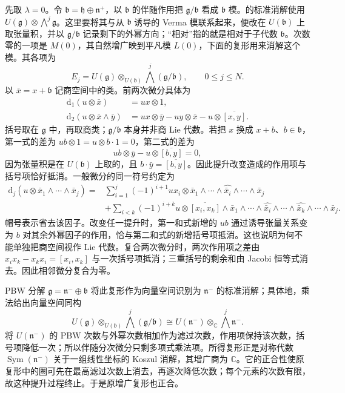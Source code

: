 \begin{proofsketch}
	先取 \(\lambda=0\)。令 \(\mathfrak b=\mathfrak h\oplus\mathfrak n^+\)，以 \(\mathfrak b\) 的伴随作用把 \(\mathfrak g/\mathfrak b\) 看成 \(\mathfrak b\) 模。的标准消解使用 \(U(\mathfrak g)\otimes\bigwedge^j\mathfrak g\)。这里要将其与从 \(\mathfrak b\) 诱导的 Verma 模联系起来，便改在 \(U(\mathfrak b)\) 上取张量积，并以 \(\mathfrak g/\mathfrak b\) 记录剩下的外幂方向；“相对”指的就是相对于子代数 \(\mathfrak b\)。次数零的一项是 \(M(0)\)，其自然增广映到平凡模 \(L(0)\)，下面的复形用来消解这个模。其各项为
	\[
		E_j=U(\mathfrak g)\otimes_{U(\mathfrak b)} \bigwedge^j(\mathfrak g/\mathfrak b), \qquad 0\le j\le N.
	\]
	以 \(\bar x=x+\mathfrak b\) 记商空间中的类。前两次微分具体为
	\[
		\begin{aligned}
			\mathrm{d}_1(u\otimes\bar x)&=ux\otimes1,\\
			\mathrm{d}_2(u\otimes\bar x\wedge\bar y) &=ux\otimes\bar y-uy\otimes\bar x-u\otimes\overline{[x,y]}.
		\end{aligned}
	\]
	括号取在 \(\mathfrak g\) 中，再取商类；\(\mathfrak g/\mathfrak b\) 本身并非商 Lie 代数。若把 \(x\) 换成 \(x+b\)、\(b\in\mathfrak b\)，第一式的差为 \(ub\otimes1=u\otimes b\cdot1=0\)，第二式的差为
	\[
		ub\otimes\bar y-u\otimes\overline{[b,y]}=0,
	\]
	因为张量积是在 \(U(\mathfrak b)\) 上取的，且 \(b\cdot\bar y=\overline{[b,y]}\)。因此提升改变造成的作用项与括号项恰好抵消。一般微分的同一符号约定为
	\[
		\begin{aligned}
			\mathrm d_j(u\otimes\bar x_1\wedge\cdots\wedge\bar x_j) ={}&\sum_{i=1}^j(-1)^{i+1}ux_i\otimes \bar x_1\wedge\cdots\wedge\widehat{\bar x_i}\wedge\cdots\wedge\bar x_j\\
			&+\sum_{i<k}(-1)^{i+k}u\otimes\overline{[x_i,x_k]}\wedge \bar x_1\wedge\cdots\wedge\widehat{\bar x_i}\wedge\cdots \wedge\widehat{\bar x_k}\wedge\cdots\wedge\bar x_j.
		\end{aligned}
	\]
	帽号表示省去该因子。改变任一提升时，第一和式新增的 \(ub\) 通过诱导张量关系变为 \(b\) 对其余外幂因子的作用，恰与第二和式的新增括号项抵消。这也说明为何不能单独把商空间视作 Lie 代数。复合两次微分时，两次作用项之差由 \(x_ix_k-x_kx_i=[x_i,x_k]\) 与一次括号项抵消；三重括号的剩余和由 Jacobi 恒等式消去。因此相邻微分复合为零。

	PBW 分解 \(\mathfrak g=\mathfrak n^-\oplus\mathfrak b\) 将此复形作为向量空间识别为 \(\mathfrak n^-\) 的标准消解；具体地，乘法给出向量空间同构
	\[
		U(\mathfrak g)\otimes_{U(\mathfrak b)}\bigwedge^j(\mathfrak g/\mathfrak b) \cong U(\mathfrak n^-)\otimes_{\mathbb C}\bigwedge^j\mathfrak n^-.
	\]
	将 \(U(\mathfrak n^-)\) 的 PBW 次数与外幂次数相加作为滤过次数，作用项保持该次数，括号项降低一次；所以伴随分次微分只剩多项式乘法项。所得复形正是对称代数 \(\operatorname{Sym}(\mathfrak n^-)\) 关于一组线性坐标的 Koszul 消解，其增广商为 \(\mathbb C\)。它的正合性使原复形中的圈可先在最高滤过次数上消去，再逐次降低次数；每个元素的次数有限，故这种提升过程终止。于是原增广复形也正合。


\end{proofsketch}
